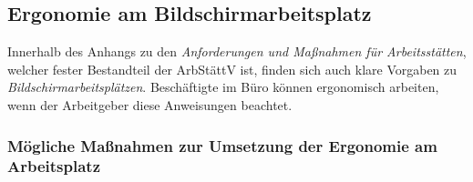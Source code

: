 \documentclass[a4paper, 12pt]{report}
\begin{document}
\subsection{Ergonomie am Bildschirmarbeitsplatz}

Innerhalb des Anhangs zu den \emph{Anforderungen und Maßnahmen für
Arbeitsstätten}, welcher fester Bestandteil der ArbStättV ist, finden sich auch
klare Vorgaben zu \emph{Bildschirmarbeitsplätzen}. Beschäftigte im Büro können
ergonomisch arbeiten, wenn der Arbeitgeber diese Anweisungen beachtet.

\subsubsection{Mögliche Maßnahmen zur Umsetzung der Ergonomie am Arbeitsplatz}
\end{document}
